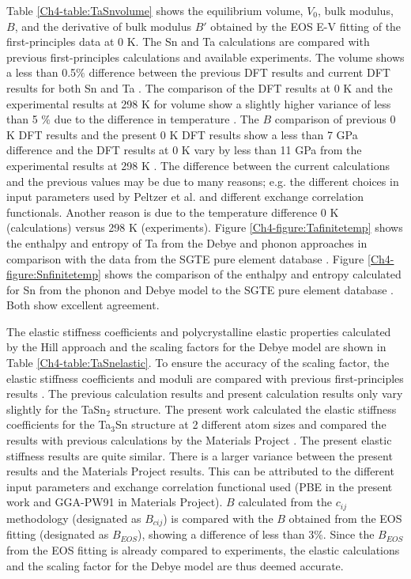 Table \ref{Ch4-table:TaSnvolume} shows the equilibrium volume, $V_{0}$, bulk modulus, $B$, and the derivative of bulk modulus $B'$ obtained by the EOS E-V fitting of the first-principles data at 0 K.  The Sn and Ta calculations are compared with previous first-principles calculations and available experiments. The volume shows a less than 0.5$\%$ difference between the previous DFT results and current DFT results for both Sn and Ta \cite{Predmore1970,PeltzeryBlanca1993a}. The comparison of the DFT results at 0 K and the experimental results at 298 K for volume show a slightly higher variance of less than 5 $\%$ due to the difference in temperature \cite{Shang2010b,PeltzeryBlanca1993a}. The $B$ comparison of previous 0 K DFT results and the present 0 K DFT results show a less than 7 GPa difference and the DFT results at 0 K vary by less than 11 GPa from the experimental results at 298 K \cite{Predmore1970,Shang2010b,PeltzeryBlanca1993a}. The difference between the current calculations and the previous values may be due to many reasons; e.g. the different choices in input parameters used by Peltzer et al. \cite{PeltzeryBlanca1993a} and different exchange correlation functionals. Another reason is due to the temperature difference 0 K (calculations) versus 298 K (experiments). Figure \ref{Ch4-figure:Tafinitetemp} shows the enthalpy and entropy of Ta from the Debye and phonon approaches in comparison with the data from the SGTE pure element database \cite{Dinsdale1991}. Figure \ref{Ch4-figure:Snfinitetemp} shows the comparison of the enthalpy and entropy calculated for Sn from the phonon and Debye model to the SGTE pure element database \cite{Dinsdale1991}. Both show excellent agreement.

The elastic stiffness coefficients and polycrystalline elastic properties calculated by the Hill approach and the scaling factors for the Debye model are shown in Table \ref{Ch4-table:TaSnelastic}. To ensure the accuracy of the scaling factor, the elastic stiffness coefficients and moduli are compared with previous first-principles results \cite{Jouault1967_611,Bergerhoff1983,Geller1955_165,Karlsruhe,MaterialsProject}. The previous calculation results and present calculation results only vary slightly for the TaSn$_2$ structure. The present work calculated the elastic stiffness coefficients for the Ta$_3$Sn structure at 2 different atom sizes and compared the results with previous calculations by the Materials Project \cite{Jouault1967_611,Bergerhoff1983,Geller1955_165,Karlsruhe,MaterialsProject}. The present elastic stiffness results are quite similar. There is a larger variance between the present results and the Materials Project results. This can be attributed to the different input parameters and exchange correlation functional used (PBE in the present work and GGA-PW91 in Materials Project). $B$ calculated from the $c_{ij}$ methodology (designated as $B_{cij}$) is compared with the $B$ obtained from the EOS fitting (designated as $B_{EOS}$), showing a difference of less than 3$\%$. Since the $B_{EOS}$ from the EOS fitting is already compared to experiments, the elastic calculations and the scaling factor for the Debye model are thus deemed accurate.

